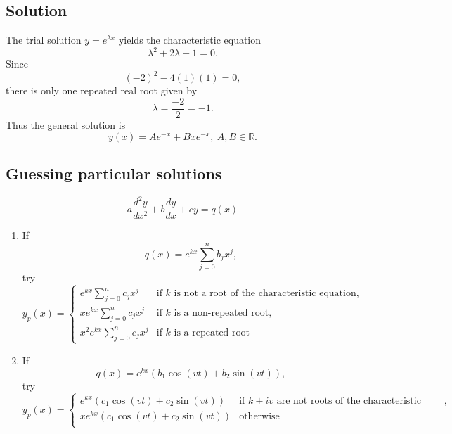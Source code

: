 \documentclass[11pt]{article}
\newcommand{\reals}{\mathbb{R}}
\begin{document}
\subsection*{Solution}
The trial solution $y = e^{\lambda x}$ yields the characteristic equation
\[ \lambda^2 + 2\lambda + 1 = 0. \]
Since
\[ (-2)^2 - 4(1)(1) = 0, \]
there is only one repeated real root given by
\[ \lambda = \frac{-2}{2} = -1. \]
Thus the general solution is
\[ y(x) = Ae^{-x} + Bxe^{-x},\ A, B \in \reals. \]

\subsection{Guessing particular solutions}
\[ a\frac{d^2y}{dx^2} + b \frac{dy}{dx} + cy = q(x) \]
\begin{enumerate}[ (i) ]
\item If
\[ q(x) = e^{kx} \sum_{j=0}^n b_j x^j, \]
try
\[ y_p(x) = \begin{cases}
e^{kx} \displaystyle{\sum_{j=0}^n c_j x^j} & \text{if } k \text{ is not a root of the characteristic equation}, \\
x e^{kx} \displaystyle{\sum_{j=0}^n c_j x^j}  & \text{if } k \text{ is a non-repeated root}, \\
 x^2 e^{kx} \displaystyle{\sum_{j=0}^n c_j x^j}  & \text{if } k \text{ is a repeated root}
\end{cases} \]

\item If
\[ q(x) = e^{kx} (b_1 \cos(vt) + b_2 \sin(vt)), \]
try
\[ y_p(x) = \begin{cases}
e^{kx} (c_1 \cos(vt) + c_2 \sin(vt)) & \text{if } k \pm iv \text{ are not roots of the characteristic equation}, \\
xe^{kx} (c_1 \cos(vt) + c_2 \sin(vt)) & \text{otherwise} \\
\end{cases} \]
\end{enumerate}
\end{document}
